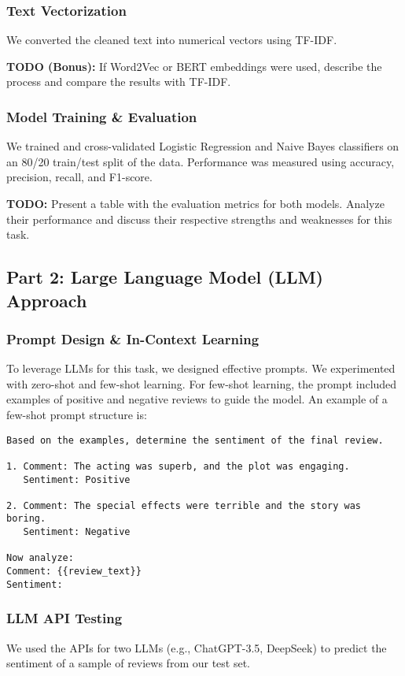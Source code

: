 \documentclass{article}
\begin{document}
\subsubsection{Text Vectorization}
\label{sssec:vectorization}
We converted the cleaned text into numerical vectors using TF-IDF.

\textbf{TODO (Bonus):} If Word2Vec or BERT embeddings were used, describe the process and compare the results with TF-IDF.

\subsubsection{Model Training \& Evaluation}
\label{sssec:ml_training}
We trained and cross-validated Logistic Regression and Naive Bayes classifiers on an 80/20 train/test split of the data. Performance was measured using accuracy, precision, recall, and F1-score.

\textbf{TODO:} Present a table with the evaluation metrics for both models. Analyze their performance and discuss their respective strengths and weaknesses for this task.

\subsection{Part 2: Large Language Model (LLM) Approach}
\label{ssec:llm_approach}

\subsubsection{Prompt Design \& In-Context Learning}
\label{sssec:prompt_design}
To leverage LLMs for this task, we designed effective prompts. We experimented with zero-shot and few-shot learning. For few-shot learning, the prompt included examples of positive and negative reviews to guide the model. An example of a few-shot prompt structure is:

\begin{verbatim}
Based on the examples, determine the sentiment of the final review.

1. Comment: The acting was superb, and the plot was engaging.
   Sentiment: Positive

2. Comment: The special effects were terrible and the story was boring.
   Sentiment: Negative

Now analyze:
Comment: {{review_text}}
Sentiment:
\end{verbatim}

\subsubsection{LLM API Testing}
\label{sssec:llm_api}
We used the APIs for two LLMs (e.g., ChatGPT-3.5, DeepSeek) to predict the sentiment of a sample of reviews from our test set.
\end{document}
